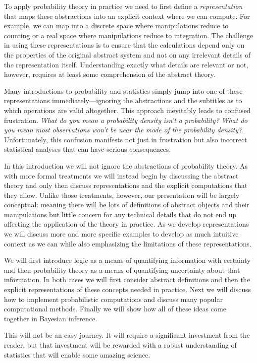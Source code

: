To apply probability theory in practice we need to first define a \emph{representation}
that maps these abstractions into an explicit context where we can compute.
For example, we can map into a discrete space where manipulations reduce
to counting or a real space where manipulations reduce to integration.  The
challenge in using these representations is to ensure that the calculations depend
only on the properties of the original abstract system and not on any irrelevant details
of the representation itself.  Understanding exactly what details are relevant or
not, however, requires at least some comprehension of the abstract theory.

Many introductions to probability and statistics simply jump into one of these
representations immediately---ignoring the abstractions and the subtitles as to
which operations are valid altogether.  This approach inevitably leads to
confused frustration.  \emph{What do you mean a probability \emph{density} isn't
a probability?  What do you mean most observations won't be near the mode
of the probability density?}.  Unfortunately, this confusion manifests not just in
frustration but also incorrect statistical analyses that can have serious consequences.

In this introduction we will not ignore the abstractions of probability theory.
As with more formal treatments we will instead begin by discussing the abstract
theory and only then discuss representations and the explicit computations that
they allow.  Unlike those treatments, however, our presentation will be largely
conceptual: meaning there will be lots of definitions of abstract objects and their manipulations
but little concern for any technical details that do not end up affecting the
application of the theory in practice.  As we develop representations we will discuss
more and more specific examples to develop as much intuitive context as we can while
also emphasizing the limitations of these representations.

We will first introduce logic as a means of quantifying information with certainty
and then probability theory as a means of quantifying uncertainty about that
information.  In both cases we will first consider abstract definitions and then the
explicit representations of these concepts needed in practice.  Next we will discuss
how to implement probabilistic computations and discuss many popular computational
methods.  Finally we will show how all of these ideas come together in Bayesian
inference.

This will not be an easy journey.  It will require a significant investment from the
reader, but that investment will be rewarded with a robust understanding of
statistics that will enable some amazing science.

